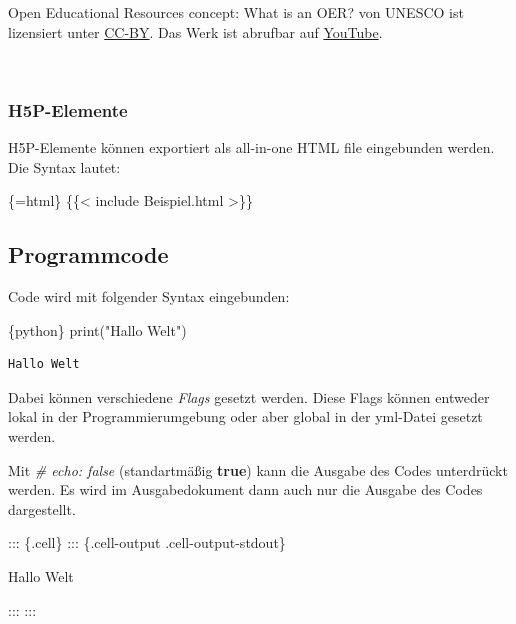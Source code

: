 \documentclass[
  letterpaper,
  DIV=11]{scrartcl}
\newenvironment{Shaded}{\begin{snugshade}}{\end{snugshade}}
\newcommand{\InformationTok}[1]{\textcolor[rgb]{0.37,0.37,0.37}{#1}}
\newcommand{\NormalTok}[1]{\textcolor[rgb]{0.00,0.23,0.31}{#1}}
\begin{document}
Open Educational Resources concept: What is an OER? von UNESCO ist
lizensiert unter
\href{https://creativecommons.org/licenses/by/4.0/}{CC-BY}. Das Werk ist
abrufbar auf
\href{https://www.youtube.com/watch?v=EImihZVE0sA}{YouTube}.

~

\subsubsection*{H5P-Elemente}\label{h5p-elemente}

H5P-Elemente können exportiert als all-in-one HTML file eingebunden
werden. Die Syntax lautet:

\begin{Shaded}
\begin{Highlighting}[]
\NormalTok{\{=html\}}
\NormalTok{\{\{\textless{} include Beispiel.html \textgreater{}\}\}}
\end{Highlighting}
\end{Shaded}

\subsection{Programmcode}\label{programmcode-1}

Code wird mit folgender Syntax eingebunden:

\begin{Shaded}
\begin{Highlighting}[]
\InformationTok{\textasciigrave{}\textasciigrave{}\textasciigrave{}\{python\}}
\InformationTok{print("Hallo Welt")}
\InformationTok{\textasciigrave{}\textasciigrave{}\textasciigrave{}}
\end{Highlighting}
\end{Shaded}

\begin{verbatim}
Hallo Welt
\end{verbatim}

Dabei können verschiedene \emph{Flags} gesetzt werden. Diese Flags
können entweder lokal in der Programmierumgebung oder aber global in der
yml-Datei gesetzt werden.

Mit \emph{\#\textbar{} echo: false} (standartmäßig \textbf{true}) kann
die Ausgabe des Codes unterdrückt werden. Es wird im Ausgabedokument
dann auch nur die Ausgabe des Codes dargestellt.

\begin{Shaded}
\begin{Highlighting}[]
\NormalTok{::: \{.cell\}}
\NormalTok{::: \{.cell{-}output .cell{-}output{-}stdout\}}

\NormalTok{\textasciigrave{}\textasciigrave{}\textasciigrave{}}
\NormalTok{Hallo Welt}
\NormalTok{\textasciigrave{}\textasciigrave{}\textasciigrave{}}


\NormalTok{:::}
\NormalTok{:::}
\end{Highlighting}
\end{Shaded}
\end{document}
